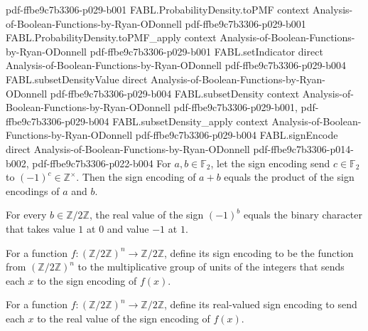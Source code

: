 \begin{theorem}
  {pdf-ffbe9c7b3306-p029-b001}
\proofstep
  {FABL.ProbabilityDensity.toPMF}
  {context}
  {Analysis-of-Boolean-Functions-by-Ryan-ODonnell}
  {pdf-ffbe9c7b3306-p029-b001}
\proofstep
  {FABL.ProbabilityDensity.toPMF_apply}
  {context}
  {Analysis-of-Boolean-Functions-by-Ryan-ODonnell}
  {pdf-ffbe9c7b3306-p029-b001}
\proofstep
  {FABL.setIndicator}
  {direct}
  {Analysis-of-Boolean-Functions-by-Ryan-ODonnell}
  {pdf-ffbe9c7b3306-p029-b004}
\proofstep
  {FABL.subsetDensityValue}
  {direct}
  {Analysis-of-Boolean-Functions-by-Ryan-ODonnell}
  {pdf-ffbe9c7b3306-p029-b004}
\proofstep
  {FABL.subsetDensity}
  {context}
  {Analysis-of-Boolean-Functions-by-Ryan-ODonnell}
  {pdf-ffbe9c7b3306-p029-b001,
    pdf-ffbe9c7b3306-p029-b004}
\proofstep
  {FABL.subsetDensity_apply}
  {context}
  {Analysis-of-Boolean-Functions-by-Ryan-ODonnell}
  {pdf-ffbe9c7b3306-p029-b004}
\proofstep
  {FABL.signEncode}
  {direct}
  {Analysis-of-Boolean-Functions-by-Ryan-ODonnell}
  {pdf-ffbe9c7b3306-p014-b002,
    pdf-ffbe9c7b3306-p022-b004}
For $a,b\in\mathbb{F}_2$, let the sign encoding send $c\in\mathbb{F}_2$ to
$(-1)^c\in\mathbb{Z}^{\times}$. Then the sign encoding of $a+b$ equals the product of
the sign encodings of $a$ and $b$.
\end{theorem}

\begin{theorem}
\label{FABL.signValue_signEncode_eq_binarySign}
\leanok
{}
For every $b\in\mathbb{Z}/2\mathbb{Z}$, the real value of the sign $(-1)^b$ equals the
binary character that takes value $1$ at $0$ and value $-1$ at $1$.
\end{theorem}

\begin{definition}
\label{FABL.signEncodedFunction}
\leanok
{}
For a function $f:(\mathbb{Z}/2\mathbb{Z})^n\to\mathbb{Z}/2\mathbb{Z}$, define its sign
encoding to be the function from $(\mathbb{Z}/2\mathbb{Z})^n$ to the multiplicative
group of units of the integers that sends each $x$ to the sign encoding of $f(x)$.
\end{definition}

\begin{definition}
\label{FABL.realSignEncodedFunction}
\leanok
{}
For a function $f:(\mathbb{Z}/2\mathbb{Z})^n\to\mathbb{Z}/2\mathbb{Z}$, define its
real-valued sign encoding to send each $x$ to the real value of the sign encoding of
$f(x)$.
\end{definition}

